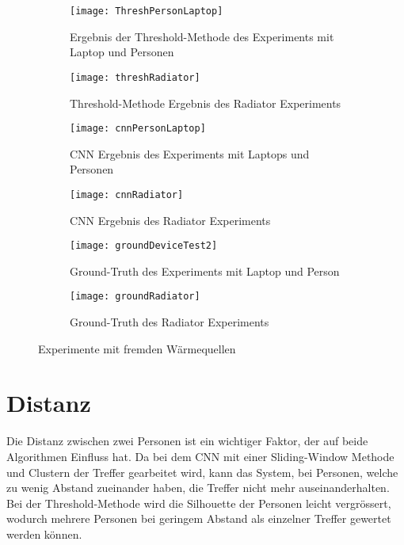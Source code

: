 \vspace{.5em}
\begin{figure}[htb]
	\centering
	\begin{subfigure}{.45\linewidth}
		\centering
		\texttt{[image: ThreshPersonLaptop]}
		\caption{Ergebnis der Threshold-Methode des Experiments mit Laptop und Personen}
		\label{fig:ThreshPersonLaptop}
	\end{subfigure}\hfill%
	\begin{subfigure}{.45\linewidth}
		\centering
		\texttt{[image: threshRadiator]}
		\caption{Threshold-Methode Ergebnis des Radiator Experiments}
		\label{fig:thresholdRadiator}
	\end{subfigure}\hfill%
	\begin{subfigure}{.45\linewidth}
		\centering
		\texttt{[image: cnnPersonLaptop]}
		\caption{CNN Ergebnis des Experiments mit Laptops und Personen}
		\label{fig:cnnPersonLaptop}
	\end{subfigure}\hfill%
	\begin{subfigure}{.45\linewidth}
		\centering
		\texttt{[image: cnnRadiator]}
		\caption{CNN Ergebnis des Radiator Experiments}
		\label{fig:cnnRadiator}
	\end{subfigure}\hfill%
	\begin{subfigure}{.5\linewidth}
		\centering
		\texttt{[image: groundDeviceTest2]}
		\caption{Ground-Truth des Experiments mit Laptop und Person}
		\label{fig:groundPersonLaptop}
	\end{subfigure}\hfill%
	\begin{subfigure}{.5\linewidth}
		\centering
		\texttt{[image: groundRadiator]}
		\caption{Ground-Truth des Radiator Experiments}
		\label{fig:groundRadiator}
	\end{subfigure}\hfill%
	\caption{Experimente mit fremden Wärmequellen}
	\label{fig:HeatSources}
\end{figure}
\vspace{.5em}



\section{Distanz}
\label{sec:distanz}

Die Distanz zwischen zwei Personen ist ein wichtiger Faktor, der auf beide Algorithmen Einfluss hat. Da bei dem \gls{CNN} mit einer Sliding-Window Methode und Clustern der Treffer gearbeitet wird, kann das System, bei Personen, welche zu wenig Abstand zueinander haben, die Treffer nicht mehr auseinanderhalten. Bei der Threshold-Methode wird die Silhouette der Personen leicht vergrössert, wodurch mehrere Personen bei geringem Abstand als einzelner Treffer gewertet werden können.

